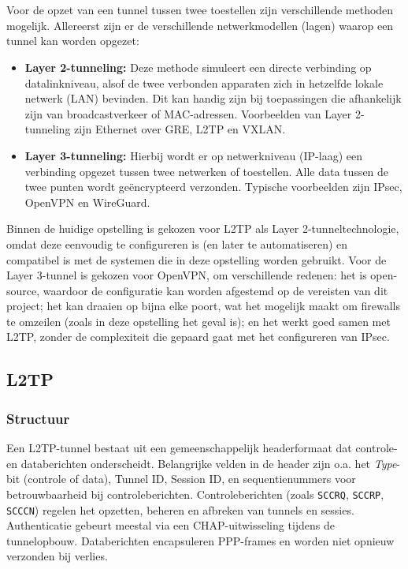 \chapter{}%
\label{ch:tunnel-technologieën}

Voor de opzet van een tunnel tussen twee toestellen zijn verschillende methoden mogelijk. Allereerst zijn er de verschillende netwerkmodellen (lagen) waarop een tunnel kan worden opgezet:
\begin{itemize}
    \item \textbf{Layer 2-tunneling:} Deze methode simuleert een directe verbinding op datalinkniveau, alsof de twee verbonden apparaten zich in hetzelfde lokale netwerk (LAN) bevinden. Dit kan handig zijn bij toepassingen die afhankelijk zijn van broadcastverkeer of MAC-adressen. Voorbeelden van Layer 2-tunneling zijn Ethernet over GRE, L2TP en VXLAN.
    \item \textbf{Layer 3-tunneling:} Hierbij wordt er op netwerkniveau (IP-laag) een verbinding opgezet tussen twee netwerken of toestellen. Alle data tussen de twee punten wordt geëncrypteerd verzonden. Typische voorbeelden zijn IPsec, OpenVPN en WireGuard.
\end{itemize}
Binnen de huidige opstelling is gekozen voor L2TP als Layer 2-tunneltechnologie, omdat deze eenvoudig te configureren is (en later te automatiseren) en compatibel is met de systemen die in deze opstelling worden gebruikt.
Voor de Layer 3-tunnel is gekozen voor OpenVPN, om verschillende redenen: het is open-source, waardoor de configuratie kan worden afgestemd op de vereisten van dit project; 
het kan draaien op bijna elke poort, wat het mogelijk maakt om firewalls te omzeilen (zoals in deze opstelling het geval is); 
en het werkt goed samen met L2TP, zonder de complexiteit die gepaard gaat met het configureren van IPsec.

\section{L2TP}
\label{sec:layer2}


\subsection{Structuur}

Een L2TP-tunnel bestaat uit een gemeenschappelijk headerformaat dat controle- en databerichten onderscheidt. Belangrijke velden in de header zijn o.a. het \textit{Type}-bit (controle of data), Tunnel ID, Session ID, en sequentienummers voor betrouwbaarheid bij controleberichten. 
Controleberichten (zoals \texttt{SCCRQ}, \texttt{SCCRP}, \texttt{SCCCN}) regelen het opzetten, beheren en afbreken van tunnels en sessies. Authenticatie gebeurt meestal via een CHAP-uitwisseling tijdens de tunnelopbouw. Databerichten encapsuleren PPP-frames en worden niet opnieuw verzonden bij verlies.
\\

